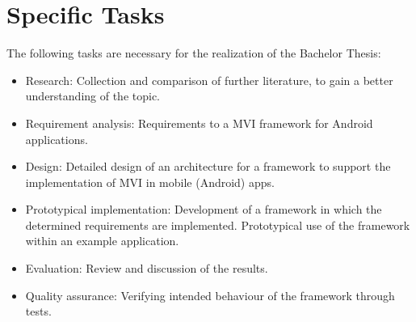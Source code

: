 \section{Specific Tasks}
\label{sec:specific-tasks}

The following tasks are necessary for the realization of the Bachelor Thesis:
%
\begin{itemize}
    \item Research: Collection and comparison of further literature, to gain a better understanding of the topic.
    \item Requirement analysis: Requirements to a MVI framework for Android applications.
    \item Design: Detailed design of an architecture for a framework to support the implementation of MVI in mobile (Android) apps.
    \item Prototypical implementation: Development of a framework in which the determined requirements are implemented.
    Prototypical use of the framework within an example application.
    \item Evaluation: Review and discussion of the results.
    \item Quality assurance: Verifying intended behaviour of the framework through tests.
\end{itemize}